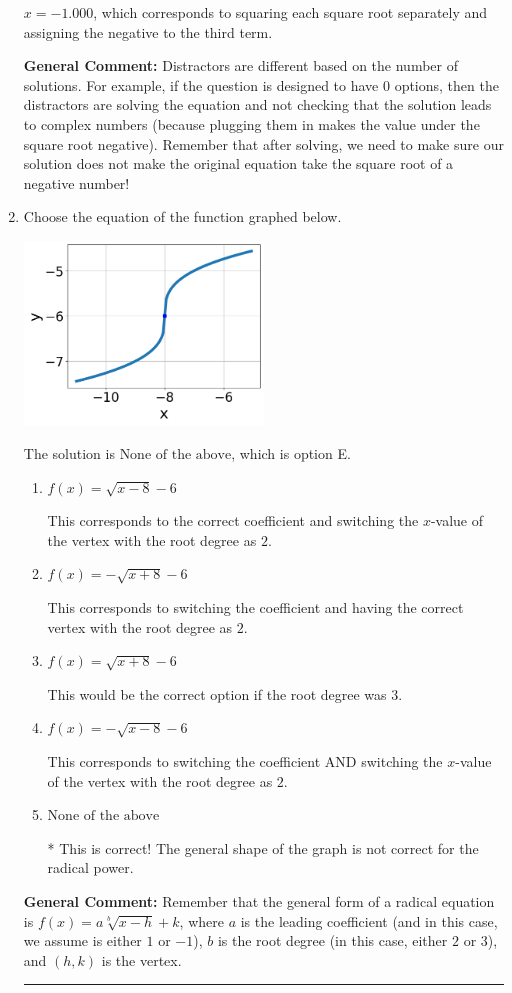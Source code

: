 \documentclass{extbook}[14pt]
\newcommand{\litem}[1]{\item #1

\rule{\textwidth}{0.4pt}}
\begin{document}
\begin{enumerate}
{\begin{enumerate}[label=\Alph*.]
$x = -1.000$, which corresponds to squaring each square root separately and assigning the negative to the third term.
\end{enumerate}

\textbf{General Comment:} Distractors are different based on the number of solutions. For example, if the question is designed to have 0 options, then the distractors are solving the equation and not checking that the solution leads to complex numbers (because plugging them in makes the value under the square root negative). Remember that after solving, we need to make sure our solution does not make the original equation take the square root of a negative number!
}
\litem{
Choose the equation of the function graphed below.

\begin{center}
    \includegraphics[width=0.5\textwidth]{../Figures/radicalGraphToEquationB.png}
\end{center}




The solution is \( \text{None of the above} \), which is option E.\begin{enumerate}[label=\Alph*.]
\item \( f(x) = \sqrt{x - 8} - 6 \)

This corresponds to the correct coefficient and switching the $x$-value of the vertex with the root degree as $2$.
\item \( f(x) = - \sqrt{x + 8} - 6 \)

This corresponds to switching the coefficient and having the correct vertex with the root degree as $2$.
\item \( f(x) = \sqrt{x + 8} - 6 \)

This would be the correct option if the root degree was $3$.
\item \( f(x) = - \sqrt{x - 8} - 6 \)

This corresponds to switching the coefficient AND switching the $x$-value of the vertex with the root degree as $2$.
\item \( \text{None of the above} \)

* This is correct! The general shape of the graph is not correct for the radical power.
\end{enumerate}

\textbf{General Comment:} Remember that the general form of a radical equation is $ f(x) = a \sqrt[b]{x - h} + k$, where $a$ is the leading coefficient (and in this case, we assume is either $1$ or $-1$), $b$ is the root degree (in this case, either $2$ or $3$), and $(h, k)$ is the vertex.
}
\end{enumerate}
\end{document}
